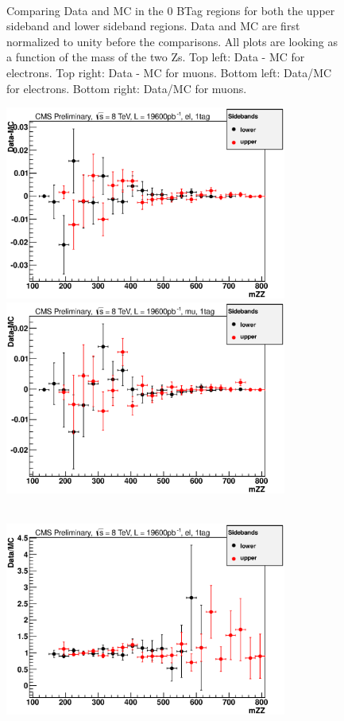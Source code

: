 \begin{figure}[htb!]
{\\
}
\caption{Comparing Data and MC in the 0 BTag regions for both the upper sideband and lower sideband regions. Data and MC are first normalized to unity before the comparisons. All plots are looking as a function of the mass of the two Zs. Top left: Data - MC for electrons.  Top right: Data - MC for muons.  Bottom left: Data/MC for electrons.  Bottom right: Data/MC for muons.
\label{fig:0tag_sideband_up_down}}  
\end{figure}
\begin{figure}[htb!]
\centerline{
\includegraphics[height=2.5in]{Systematics/plots/subtract_el_2_1}
\includegraphics[height=2.5in]{Systematics/plots/subtract_mu_2_1}}
\centerline{
\\
\includegraphics[height=2.5in]{Systematics/plots/divide_el_2_1}
}
\end{figure}
